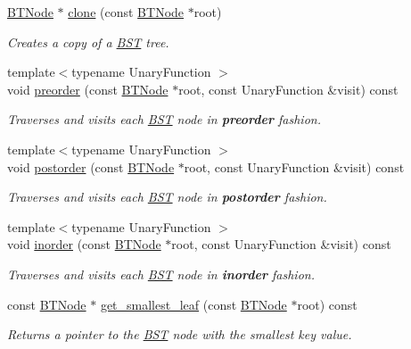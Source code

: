 \begin{DoxyCompactItemize}
\hyperlink{struct_b_s_t_1_1_b_t_node}{B\+T\+Node} $\ast$ \hyperlink{class_b_s_t_af21ef870def521a698f5ad9672badd1f}{clone} (const \hyperlink{struct_b_s_t_1_1_b_t_node}{B\+T\+Node} $\ast$root)
\begin{DoxyCompactList}\small\item\em Creates a copy of a \hyperlink{class_b_s_t}{B\+ST} tree. \end{DoxyCompactList}\item 
{\footnotesize template$<$typename Unary\+Function $>$ }\\void \hyperlink{class_b_s_t_a10b4da6797656b7155f92fa7e2be3f1d}{preorder} (const \hyperlink{struct_b_s_t_1_1_b_t_node}{B\+T\+Node} $\ast$root, const Unary\+Function \&visit) const 
\begin{DoxyCompactList}\small\item\em Traverses and visits each \hyperlink{class_b_s_t}{B\+ST} node in {\bfseries preorder} fashion. \end{DoxyCompactList}\item 
{\footnotesize template$<$typename Unary\+Function $>$ }\\void \hyperlink{class_b_s_t_a11b5bd16742a542b361eebe5f2baa310}{postorder} (const \hyperlink{struct_b_s_t_1_1_b_t_node}{B\+T\+Node} $\ast$root, const Unary\+Function \&visit) const 
\begin{DoxyCompactList}\small\item\em Traverses and visits each \hyperlink{class_b_s_t}{B\+ST} node in {\bfseries postorder} fashion. \end{DoxyCompactList}\item 
{\footnotesize template$<$typename Unary\+Function $>$ }\\void \hyperlink{class_b_s_t_abbfbc935cb31754a1715cca4490994f8}{inorder} (const \hyperlink{struct_b_s_t_1_1_b_t_node}{B\+T\+Node} $\ast$root, const Unary\+Function \&visit) const 
\begin{DoxyCompactList}\small\item\em Traverses and visits each \hyperlink{class_b_s_t}{B\+ST} node in {\bfseries inorder} fashion. \end{DoxyCompactList}\item 
const \hyperlink{struct_b_s_t_1_1_b_t_node}{B\+T\+Node} $\ast$ \hyperlink{class_b_s_t_a2da99953436debe2868f93bd18398b11}{get\+\_\+smallest\+\_\+leaf} (const \hyperlink{struct_b_s_t_1_1_b_t_node}{B\+T\+Node} $\ast$root) const 
\begin{DoxyCompactList}\small\item\em Returns a pointer to the \hyperlink{class_b_s_t}{B\+ST} node with the smallest key value. \end{DoxyCompactList}\end{DoxyCompactItemize}
